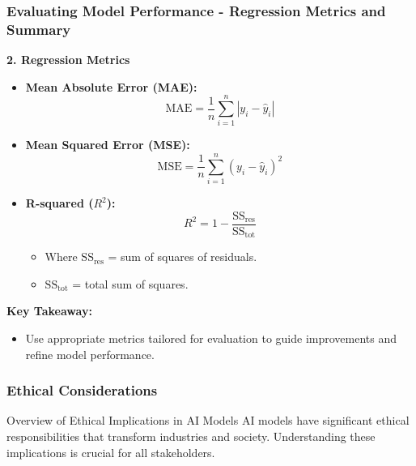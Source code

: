 \documentclass{beamer}
\begin{document}
\begin{frame}[fragile]
    \frametitle{Evaluating Model Performance - Regression Metrics and Summary}
    \textbf{2. Regression Metrics}
    \begin{itemize}
        \item \textbf{Mean Absolute Error (MAE):} 
        \begin{equation}
            \text{MAE} = \frac{1}{n} \sum_{i=1}^{n} |y_i - \hat{y}_i|
        \end{equation}

        \item \textbf{Mean Squared Error (MSE):} 
        \begin{equation}
            \text{MSE} = \frac{1}{n} \sum_{i=1}^{n} (y_i - \hat{y}_i)^2
        \end{equation}

        \item \textbf{R-squared (\(R^2\)):} 
        \begin{equation}
            R^2 = 1 - \frac{\text{SS}_{\text{res}}}{\text{SS}_{\text{tot}}}
        \end{equation}
        \begin{itemize}
            \item Where $\text{SS}_{\text{res}}$ = sum of squares of residuals.
            \item $\text{SS}_{\text{tot}}$ = total sum of squares.
        \end{itemize}
    \end{itemize}

    \textbf{Key Takeaway:}
    \begin{itemize}
        \item Use appropriate metrics tailored for evaluation to guide improvements and refine model performance.
    \end{itemize}
\end{frame}

\begin{frame}[fragile]
    \frametitle{Ethical Considerations}
    \begin{block}{Overview of Ethical Implications in AI Models}
        AI models have significant ethical responsibilities that transform industries and society.
        Understanding these implications is crucial for all stakeholders.
    \end{block}
\end{frame}
\end{document}
